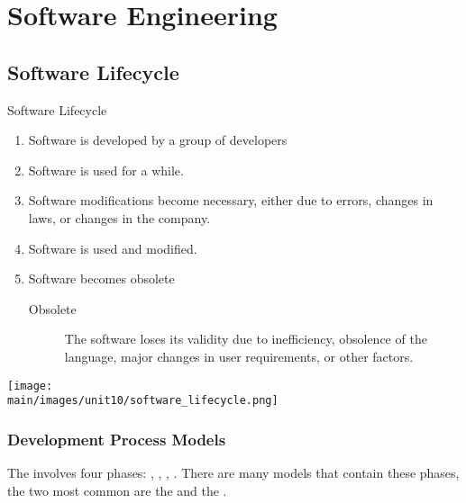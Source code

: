 \documentclass[\main/notes.tex]{subfiles}
\begin{document}
	\ifSubfilesClassLoaded{\setcounter{chapter}{9}}{}
	\chapter{Software Engineering}
		\section{Software Lifecycle}
			\begin{definition}{Software Lifecycle}
				\begin{enumerate}
					\item Software is developed by a group of developers
					\item Software is used for a while.
					\item Software modifications become necessary, either due to errors, changes in laws, or changes in the company.
					\item Software is used and modified.
					\item Software becomes obsolete
						\begin{indentparagraph}
							\begin{description}
								\item[Obsolete] The software loses its validity due to inefficiency, obsolence of the language, major changes in user requirements, or other factors.
							\end{description}
						\end{indentparagraph}
				\end{enumerate}
				\begin{center}
					\texttt{[image: \\main/images/unit10/software\_lifecycle.png]}
				\end{center}
			\end{definition}
			\subsection{Development Process Models}
				The  involves four phases: , , , . There are many models that contain these phases, the two most common are the  and the .
\end{document}

